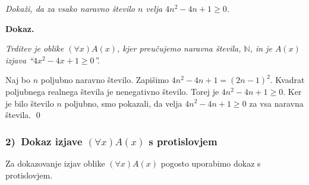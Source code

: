 \documentclass[11pt,paper=b5,DIV=13,headinclude,footinclude]{scrbook}
\newcounter{example}
\begin{document}
\medskip
\begin{example*}
\emph{ Dokaži, da za vsako naravno število $n$ velja $4n^2-4n+1\ge 0$.
}

\medskip \noindent\textbf{ Dokaz.}

\emph{ Trditev je oblike $(\forall x)A(x)$, kjer preučujemo naravna števila, $\mathbb{N}$, in je $A(x)$ izjava ``$4x^2 -4x+1 \ge 0$''.}

Naj bo $n$ poljubno naravno število. Zapišimo $4n^2 -4n+1 = (2n-1)^2$.
Kvadrat poljubnega realnega števila je nenegativno število.
Torej je $4n^2 -4n+1\ge 0$. Ker je bilo število $n$ poljubno, smo pokazali, da velja
 $4n^2-4n+1\ge 0$ za vsa naravna števila.
\qed
\end{example*}
\medskip
\begin{center}
\end{center}


\subsubsection*{2)~Dokaz izjave $(\forall x)A(x)$ s protislovjem}

Za dokazovanje izjav oblike $(\forall x)A(x)$  pogosto uporabimo dokaz s protislovjem.
\end{document}
